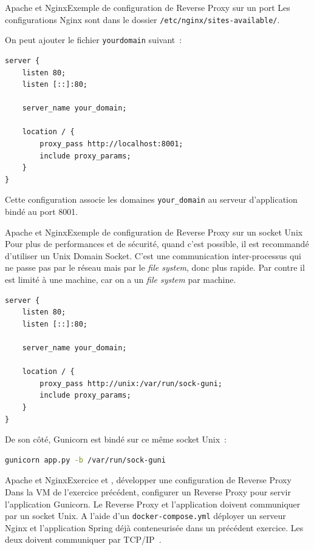 \documentclass{beamer}
\begin{document}
    \begin{frame}[fragile]{Apache et Nginx}{Exemple de configuration de Reverse Proxy sur un port}
        Les configurations Nginx sont dans le dossier \lstinline{/etc/nginx/sites-available/}.

        On peut ajouter le fichier \lstinline{yourdomain} suivant~:
        \begin{lstlisting}
server {
    listen 80;
    listen [::]:80;

    server_name your_domain;

    location / {
        proxy_pass http://localhost:8001;
        include proxy_params;
    }
}
        \end{lstlisting}
        Cette configuration associe les domaines \lstinline{your_domain} au serveur d'application bindé au port 8001.
    \end{frame}

    \begin{frame}[fragile]{Apache et Nginx}{Exemple de configuration de Reverse Proxy sur un socket Unix}
        Pour plus de performances et de sécurité, quand c'est possible, il est recommandé d'utiliser un Unix Domain Socket.
        C'est une communication inter-processus qui ne passe pas par le réseau mais par le \textit{file system}, donc plus rapide.
        Par contre il est limité à une machine, car on a un \textit{file system} par machine.
        \begin{lstlisting}
server {
    listen 80;
    listen [::]:80;

    server_name your_domain;

    location / {
        proxy_pass http://unix:/var/run/sock-guni;
        include proxy_params;
    }
}
        \end{lstlisting}
        De son côté, Gunicorn est bindé sur ce même socket Unix~:
        \begin{lstlisting}[language=bash]
gunicorn app.py -b /var/run/sock-guni
        \end{lstlisting}
    \end{frame}

    \begin{frame}{Apache et Nginx}{Exercice \execcounterdispinc{} et \execcounterdispinc{}, développer une configuration de Reverse Proxy}
        \setlength\parindent{24pt}
        Dans la VM de l'exercice précédent, configurer un Reverse Proxy pour servir l'application Gunicorn.
        Le Reverse Proxy et l'application doivent communiquer par un socket Unix.
        \bigbreak
        A l'aide d'un \lstinline{docker-compose.yml} déployer un serveur Nginx et l'application Spring déjà conteneurisée dans un précédent exercice.
        Les deux doivent communiquer par TCP/IP~.
        \setlength\parindent{0pt}
    \end{frame}
\end{document}
